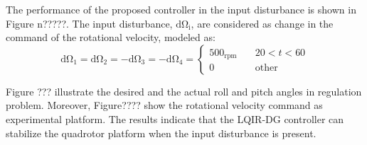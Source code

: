 \documentclass[3p,times]{elsarticle}
\begin{document}
\noindent The performance of the proposed controller in the input disturbance is shown in Figure n?????. The input disturbance, $\mathrm{d\Omega_i}$, are considered as change in the command of the rotational velocity, modeled as:
\begin{equation}
	\mathrm{d\Omega_1} = \mathrm{d\Omega_2} = -\mathrm{d\Omega_3} = -\mathrm{d\Omega_4} = \begin{cases}
		500_{\mathrm{rpm}} \quad &20<t<60\\
		0 \quad &\mathrm{other}
	\end{cases}
\end{equation}

Figure ??? illustrate the desired and the actual roll and pitch angles in regulation problem. Moreover, Figure???? show the rotational velocity command as experimental platform. The results indicate that the LQIR-DG controller can stabilize the quadrotor platform when the input disturbance is present.
\end{document}
